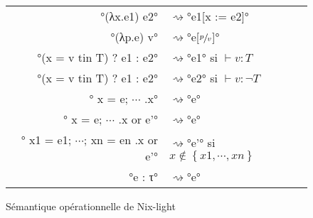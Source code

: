 \begin{figure}
  \center
  \def\leadsto{\ensuremath{\rightsquigarrow}}
  \begin{tabular}{rl}
  °(λx.e1) e2° &\leadsto °e1[x := e2]° \\
  °(λp.e) v° &\leadsto °e[$\sfrac{p}{v}$]° \\
  °(x = v tin T) ? e1 : e2° &\leadsto °e1° \quad si $\vdash v : T$ \\
  °(x = v tin T) ? e1 : e2° &\leadsto °e2° \quad si $\vdash v : \lnot T$ \\
  °{ x = e; $\cdots$ }.x° &\leadsto °e° \\
  °{ x = e; $\cdots$ }.x or e'° &\leadsto °e° \\
  °{ x1 = e1; $\cdots$; xn = en }.x or e'° &\leadsto °e'°
      \quad si $x \notin \left\{ x1, \cdots, xn \right\}$ \\
  °e : τ° &\leadsto °e°
  \end{tabular}
  \caption{Sémantique opérationnelle de Nix-light\label{nix-light::semantics}}
\end{figure}
